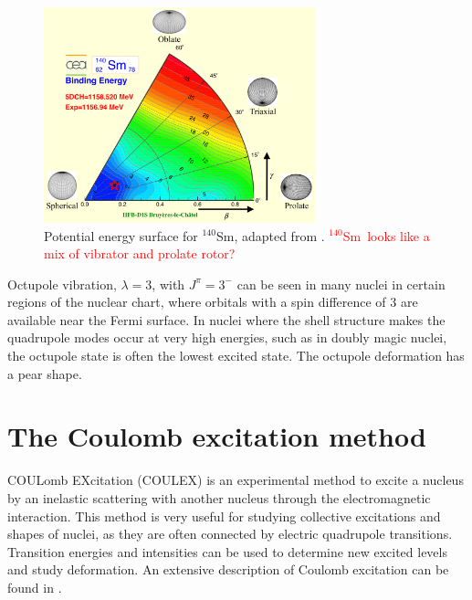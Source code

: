 \documentclass[twoside,english]{uiofysmaster/uiofysmaster}
\newcommand{\Sm}{$^{140}$Sm} %
\begin{document}
\begin{figure}[ht]
	\centering
	\includegraphics[width=0.7\textwidth]{Images/Triaxial-map-drawing.png}
	\caption{Potential energy surface for \Sm, adapted from \cite{Hilaire2007, CEA}. \textcolor{red}{\Sm\ looks like a mix of vibrator and prolate rotor?}}
	\label{fig:cea_tri}
\end{figure}

Octupole vibration, $\lambda = 3$, with $J^\pi = 3^-$ can be seen in many nuclei in certain regions of the nuclear chart, where orbitals with a spin difference of 3 are available near the Fermi surface.
In nuclei where the shell structure makes the quadrupole modes occur at very high energies, such as in doubly magic nuclei, the octupole state is often the lowest excited state.
The octupole deformation has a pear shape.



\section{The Coulomb excitation method}\label{sec:Coulex}
COULomb EXcitation (COULEX) is an experimental method to excite a nucleus by an inelastic scattering with another nucleus through the electromagnetic interaction. 
This method is very useful for studying collective excitations and shapes of nuclei, as they are often connected by electric quadrupole transitions.  
Transition energies and intensities can be used to determine new excited levels and study deformation.
An extensive description of Coulomb excitation can be found in \cite{Alder1956, EE-Coulex, Bertulani2009}.
\end{document}
